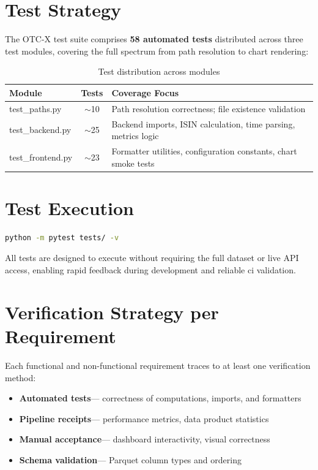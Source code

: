 \documentclass[
  11pt,
  a4paper,
  twoside,
  openany
]{report}
\begin{document}
\section{Test Strategy}

The OTC-X test suite comprises \textbf{58 automated tests} distributed across three test modules, covering the full spectrum from path resolution to chart rendering:

\begin{table}[H]
\centering
\caption{Test distribution across modules}
\label{tab:test-modules}
\begin{tabularx}{\textwidth}{>{\ttfamily}l c X}
\toprule
\textbf{Module} & \textbf{Tests} & \textbf{Coverage Focus} \\
\midrule
test\_paths.py    & $\sim$10 & Path resolution correctness; file existence validation \\
test\_backend.py  & $\sim$25 & Backend imports, ISIN calculation, time parsing, metrics logic \\
test\_frontend.py & $\sim$23 & Formatter utilities, configuration constants, chart smoke tests \\
\bottomrule
\end{tabularx}
\end{table}

\section{Test Execution}

\begin{lstlisting}[language=bash, caption={Test execution command}]
python -m pytest tests/ -v
\end{lstlisting}

All tests are designed to execute without requiring the full dataset or live API access, enabling rapid feedback during development and reliable \gls{ci} validation.

\section{Verification Strategy per Requirement}

Each functional and non-functional requirement traces to at least one verification method:

\begin{itemize}
  \item \textbf{Automated tests}\;— correctness of computations, imports, and formatters
  \item \textbf{Pipeline receipts}\;— performance metrics, data product statistics
  \item \textbf{Manual acceptance}\;— dashboard interactivity, visual correctness
  \item \textbf{Schema validation}\;— Parquet column types and ordering
\end{itemize}
\end{document}
